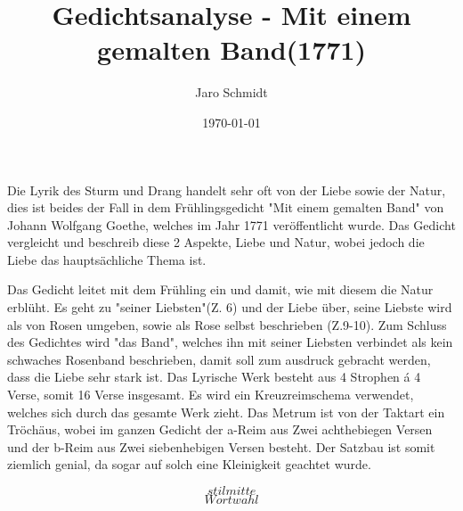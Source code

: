 \documentclass[12pt]{book}
\title{Gedichtsanalyse - Mit einem gemalten Band(1771)}
\author{Jaro Schmidt}
\date{\today}
\begin{document}
	\maketitle
	
	Die Lyrik des Sturm und Drang handelt sehr oft von der Liebe sowie der Natur, dies ist beides der Fall in dem Frühlingsgedicht "Mit einem gemalten Band" von Johann Wolfgang Goethe, welches im Jahr 1771 veröffentlicht wurde.
	Das Gedicht vergleicht und beschreib diese 2 Aspekte, Liebe und Natur, wobei jedoch die Liebe das hauptsächliche Thema ist.

	Das Gedicht leitet mit dem Frühling ein und damit, wie mit diesem die Natur erblüht. Es geht zu "seiner Liebsten"(Z. 6) und der Liebe über, seine Liebste wird als von Rosen umgeben, sowie als Rose selbst beschrieben (Z.9-10).
	Zum Schluss des Gedichtes wird "das Band", welches ihn mit seiner Liebsten verbindet als kein schwaches Rosenband beschrieben, damit soll zum ausdruck gebracht werden, dass die Liebe sehr stark ist.
	Das Lyrische Werk besteht aus 4 Strophen á 4 Verse, somit 16 Verse insgesamt. Es wird ein Kreuzreimschema verwendet, welches sich durch das gesamte Werk zieht.
	Das Metrum ist von der Taktart ein Tröchäus, wobei im ganzen Gedicht der a-Reim aus Zwei achthebiegen Versen und der b-Reim aus Zwei siebenhebigen Versen besteht.
	Der Satzbau ist somit ziemlich genial, da sogar auf solch eine Kleinigkeit geachtet wurde.

	$$ stilmitte $$
	$$ Wortwahl $$

	
\end{document}
